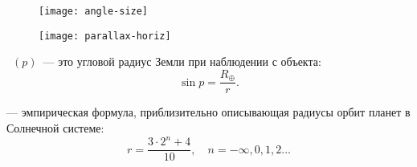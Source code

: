 \vspace{-1.5pc}
\begin{figure}[h!]
	\begin{minipage}[b]{0.5\tw}
		\begin{flushleft}
			\texttt{[image: angle-size]}
		\end{flushleft}
	\end{minipage}
	\begin{minipage}[b]{0.5\tw}
		\centering
		\texttt{[image: parallax-horiz]}
	\end{minipage}
\end{figure}

~$(p)$~--- это угловой радиус Земли при наблюдении с объекта:
\begin{equation}
\sin p=\frac{R_\oplus}{r}.
\end{equation}

 --- эмпирическая формула, приблизительно описывающая 
радиусы орбит планет в Солнечной системе:
\begin{equation}r=\frac{3\cdot 2^n+4}{10}, \quad n=-\infty, 0, 1, 2...
\end{equation}

